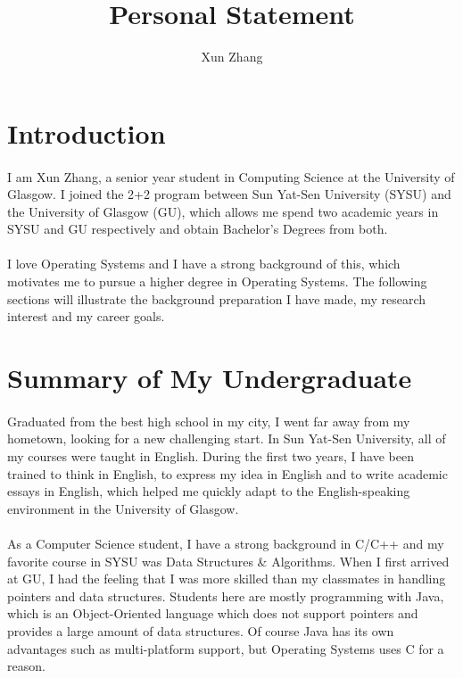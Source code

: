 \documentclass{article}
\title{Personal Statement}
\author{Xun Zhang}
\begin{document}
\maketitle%

\section{Introduction}
\paragraph{} I am Xun Zhang, a senior year student in Computing Science at the University of Glasgow. I joined the 2+2 program between Sun Yat-Sen University (SYSU) and the University of Glasgow (GU), which allows me spend two academic years in SYSU and GU respectively and obtain Bachelor's Degrees from both.

\paragraph{} I love Operating Systems and I have a strong background of this, which motivates me to pursue a higher degree in Operating Systems. The following sections will illustrate the background preparation I have made, my research interest and my career goals.

\section{Summary of My Undergraduate}
\paragraph{} Graduated from the best high school in my city, I went far away from my hometown, looking for a new challenging start. In Sun Yat-Sen University, all of my courses were taught in English. During the first two years, I have been trained to think in English, to express my idea in English and to write academic essays in English, which helped me quickly adapt to the English-speaking environment in the University of Glasgow.

\paragraph{} As a Computer Science student, I have a strong background in C/C++ and my favorite course in SYSU was Data Structures \& Algorithms. When I first arrived at GU, I had the feeling that I was more skilled than my classmates in handling pointers and data structures. Students here are mostly programming with Java, which is an Object-Oriented language which does not support pointers and provides a large amount of data structures. Of course Java has its own advantages such as multi-platform support, but Operating Systems uses C for a reason.
\end{document}
